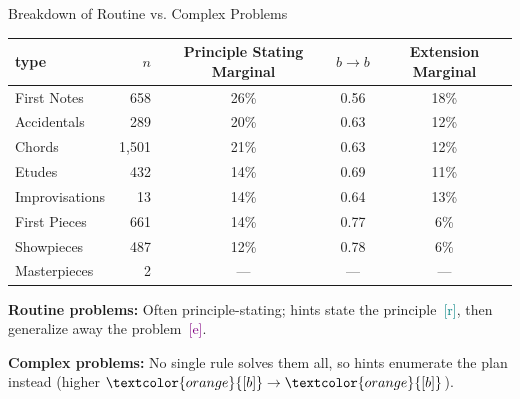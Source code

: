 \documentclass[10pt,aspectratio=169]{beamer}
\newcommand{\hr}{\textcolor{teal}{[r]}}
\newcommand{\hb}{\textcolor{orange}{[b]}}
\newcommand{\he}{\textcolor{purple}{[e]}}
\begin{document}
\begin{frame}{Breakdown of Routine vs. Complex Problems}
  \begin{table} 
    \centering 
    \small
    \begin{tabular}{lrccc}
      \toprule
      type & $n$ & Principle Stating Marginal & $b\to b$ & Extension Marginal \\
      \midrule
      First Notes & 658   & 26\% & 0.56 & 18\% \\
      Accidentals & 289   & 20\% & 0.63 & 12\%  \\
      Chords & 1{,}501 & 21\% & 0.63 & 12\%  \\
      Etudes & 432   & 14\% & 0.69 & 11\%  \\
      \midrule
      Improvisations & 13    & 14\% & 0.64 & 13\%  \\
      First Pieces & 661   & 14\% & 0.77 & 6\%  \\
      Showpieces & 487   & 12\% & 0.78 & 6\%  \\
      Masterpieces & 2     & --- & ---  & ---  \\
      \bottomrule
    \end{tabular}
    
    \vspace{0.75em} %
    
    \begin{minipage}{0.95\textwidth}
      \footnotesize %
      \textbf{Routine problems:} Often principle-stating; hints state the principle~\hr, then generalize away the problem~\he. 
      
      \vspace{0.3em}
       \pause 
      \textbf{Complex problems:} No single rule solves them all, so hints enumerate the plan instead (higher $\hb\to\hb$). 
    \end{minipage}
  \end{table} 
\end{frame}
\end{document}
